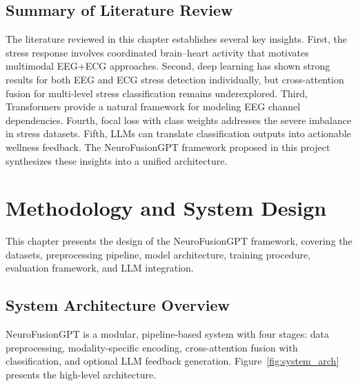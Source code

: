 \documentclass[12pt,letterpaper]{report}
\begin{document}
\section{Summary of Literature Review}
\label{sec:lit_summary}

The literature reviewed in this chapter establishes several key insights. First, the stress response involves coordinated brain--heart activity that motivates multimodal EEG+ECG approaches. Second, deep learning has shown strong results for both EEG and ECG stress detection individually, but cross-attention fusion for multi-level stress classification remains underexplored. Third, Transformers provide a natural framework for modeling EEG channel dependencies. Fourth, focal loss with class weights addresses the severe imbalance in stress datasets. Fifth, LLMs can translate classification outputs into actionable wellness feedback. The NeuroFusionGPT framework proposed in this project synthesizes these insights into a unified architecture.


\clearpage
\chapter{Methodology and System Design}
\label{ch:methodology}

This chapter presents the design of the NeuroFusionGPT framework, covering the datasets, preprocessing pipeline, model architecture, training procedure, evaluation framework, and LLM integration.

\section{System Architecture Overview}
\label{sec:system_arch}

NeuroFusionGPT is a modular, pipeline-based system with four stages: data preprocessing, modality-specific encoding, cross-attention fusion with classification, and optional LLM feedback generation. Figure~\ref{fig:system_arch} presents the high-level architecture.
\end{document}
